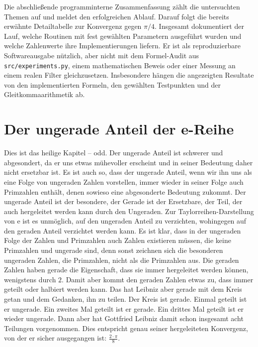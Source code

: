 \documentclass[a4paper,12pt,twoside]{report}
\theoremstyle{definition}
\begin{document}
Die abschließende programminterne Zusammenfassung zählt die untersuchten Themen auf und meldet den erfolgreichen Ablauf. Darauf folgt die bereits erwähnte Detailtabelle zur Konvergenz gegen $\pi/4$. Insgesamt dokumentiert der Lauf, welche Routinen mit fest gewählten Parametern ausgeführt wurden und welche Zahlenwerte ihre Implementierungen liefern. Er ist als reproduzierbare Softwareausgabe nützlich, aber nicht mit dem Formel-Audit aus \texttt{src/experiments.py}, einem mathematischen Beweis oder einer Messung an einem realen Filter gleichzusetzen. Insbesondere hängen die angezeigten Resultate von den implementierten Formeln, den gewählten Testpunkten und der Gleitkommaarithmetik ab.

\FloatBarrier

\section{Der ungerade Anteil der e-Reihe}
\label{sec:ug}

Dies ist das heilige Kapitel -- odd. Der ungerade Anteil ist schwerer und abgesondert, da er uns etwas mühevoller erscheint und in seiner Bedeutung daher nicht ersetzbar ist. Es ist auch so, dass der ungerade Anteil, wenn wir ihn uns als eine Folge von ungeraden Zahlen vorstellen, immer wieder in seiner Folge auch Primzahlen enthält, denen sowieso eine abgesonderte Bedeutung zukommt. Der ungerade Anteil ist der besondere, der Gerade ist der Ersetzbare, der Teil, der auch hergeleitet werden kann durch den Ungeraden. Zur Taylorreihen-Darstellung von e ist es unmöglich, auf den ungeraden Anteil zu verzichten, wohingegen auf den geraden Anteil verzichtet werden kann. Es ist klar, dass in der ungeraden Folge der Zahlen und Primzahlen auch Zahlen existieren müssen, die keine Primzahlen und ungerade sind, denn sonst zeichnen sich die besonderen ungeraden Zahlen, die Primzahlen, nicht als die Primzahlen aus. Die geraden Zahlen haben gerade die Eigenschaft, dass sie immer hergeleitet werden können, wenigstens durch $2$. Damit aber kommt den geraden Zahlen etwas zu, dass immer geteilt oder halbiert werden kann. Das hat Leibniz aber gerade mit dem Kreis getan und dem Gedanken, ihn zu teilen. Der Kreis ist gerade. Einmal geteilt ist er ungerade. Ein zweites Mal geteilt ist er gerade. Ein drittes Mal geteilt ist er wieder ungerade. Dann aber hat Gottfried Leibniz damit schon insgesamt acht Teilungen vorgenommen. Dies entspricht genau seiner hergeleiteten Konvergenz, von der er sicher ausgegangen ist: $\frac{2 \cdot \pi}{8}$.
\end{document}
